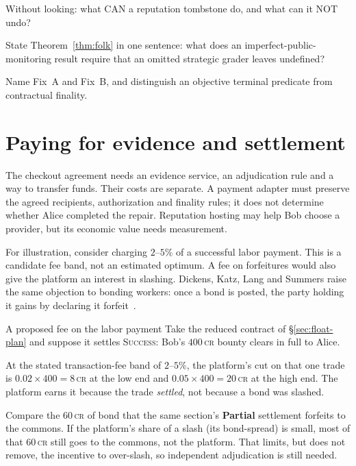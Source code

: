 \documentclass[11pt,a4paper]{article}
\theoremstyle{definition}
\theoremstyle{definition}
\theoremstyle{remark}
\begin{document}
\begin{pdrecitation}
\item Without looking: what CAN a reputation tombstone do, and what can it NOT undo?
\item State Theorem~\ref{thm:folk} in one sentence: what does an imperfect-public-monitoring result require that an omitted strategic grader leaves undefined?
\item Name Fix~A and Fix~B, and distinguish an objective terminal predicate from contractual finality.
\end{pdrecitation}

\section{Paying for evidence and settlement}\label{sec:hosted-trust}
The checkout agreement needs an evidence service, an adjudication rule and a
way to transfer funds. Their costs are separate. A payment adapter must
preserve the agreed recipients, authorization and finality rules; it does not
determine whether Alice completed the repair. Reputation hosting may help
Bob choose a provider, but its economic value needs measurement.

For illustration, consider charging $2$--$5\%$ of a successful labor payment.
This is a candidate fee band, not an estimated optimum. A fee on forfeitures
would also give the platform an interest in slashing. Dickens, Katz, Lang and
Summers raise the same objection to bonding workers: once a bond is posted,
the party holding it gains by declaring it forfeit~.

\begin{pdexample}{A proposed fee on the labor payment}
\setlength{\parskip}{4pt plus 1pt}
Take the reduced contract of \S\ref{sec:float-plan} and suppose it settles
\textsc{Success}: Bob's $400$\,\textsc{cr} bounty clears in full to Alice.

At the stated transaction-fee band of $2$--$5\%$,
the platform's cut on that one trade is $0.02\times400=8$\,\textsc{cr} at the low
end and $0.05\times400=20$\,\textsc{cr} at the high end. The platform earns it
because the trade \emph{settled}, not because a bond was slashed.

Compare the $60$\,\textsc{cr} of bond that the same section's \textbf{Partial}
settlement forfeits to the commons. If the platform's share of a slash (its
bond-spread) is small, most of that $60$\,\textsc{cr} still goes to the
commons, not the platform. That limits, but does not remove, the incentive to
over-slash, so independent adjudication is still needed.
\end{pdexample}
\end{document}

